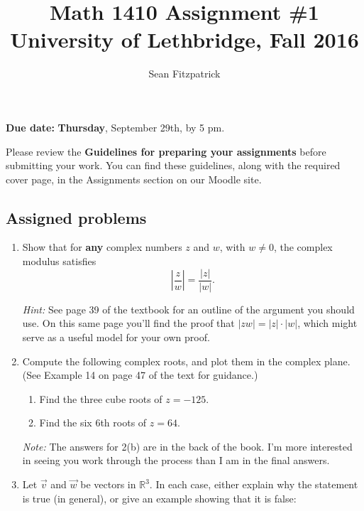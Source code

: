 \documentclass[letterpaper,12pt]{amsart}
\title{Math 1410 Assignment \#1\\University of Lethbridge, Fall 2016}
\author{Sean Fitzpatrick}
\newcommand{\abs}[1]{\lvert #1\rvert}
\newcommand{\R}{\mathbb{R}}
\begin{document}
 \maketitle

{\bf Due date:} {\bf Thursday}, September 29th, by 5 pm.

\bigskip

Please review the {\bf Guidelines for preparing your assignments} before submitting your work. You can find these guidelines, along with the required cover page, in the Assignments section on our Moodle site.



\subsection*{Assigned problems}
\begin{enumerate}
\item Show that for \textbf{any} complex numbers $z$ and $w$, with $w\neq 0$, the complex modulus satisfies
\[
 \left\lvert\frac{z}{w}\right\rvert = \frac{\abs{z}}{\abs{w}}.
\]

\medskip

\textit{Hint:} See page 39 of the textbook for an outline of the argument you should use. On this same page you'll find the proof that $\abs{zw}=\abs{z}\cdot\abs{w}$, which might serve as a useful model for your own proof.

\bigskip

\item Compute the following complex roots, and plot them in the complex plane. \\(See Example 14 on page 47 of the text for guidance.)

\medskip

\begin{enumerate}
 \item Find the three cube roots of $z=-125$.
 \item Find the six 6th roots of $z=64$.

\end{enumerate}

\medskip

\textit{Note:} The answers for 2(b) are in the back of the book. I'm more interested in seeing you work through the process than I am in the final answers.

\bigskip

\item Let $\vec{v}$ and $\vec{w}$ be vectors in $\R^3$. In each case, either explain why the statement is true (in general), or give an example showing that it is false:


\end{enumerate}
\end{document}
